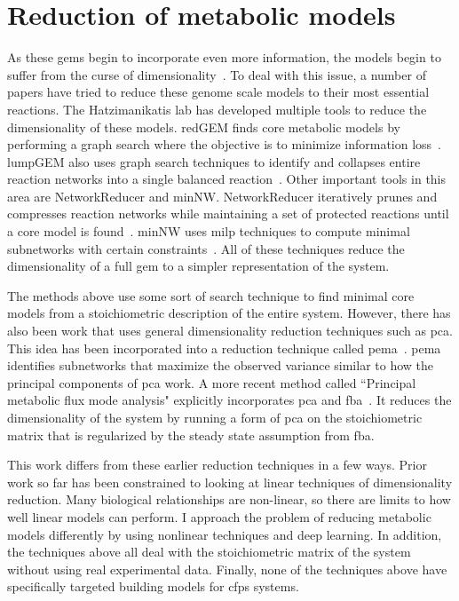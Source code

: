 \section{Reduction of metabolic models}
As these \glspl{gem} begin to incorporate even more information, the models begin to suffer from the curse of dimensionality~\cite{bellman2013dynamic}.
To deal with this issue, a number of papers have tried to reduce these genome scale models to their most essential reactions.
The Hatzimanikatis lab has developed multiple tools to reduce the dimensionality of these models.
redGEM finds core metabolic models by performing a graph search where the objective is to minimize information loss~\cite{ataman2017redgem}.
lumpGEM also uses graph search techniques to identify and collapses entire reaction networks into a single balanced reaction~\cite{ataman2017lumpgem}.
Other important tools in this area are NetworkReducer and minNW.
NetworkReducer iteratively prunes and compresses reaction networks while maintaining a set of protected reactions until a core model is found~\cite{erdrich2015algorithm}.
minNW uses \gls{milp} techniques to compute minimal subnetworks with certain constraints~\cite{rohl2017mixed}.
All of these techniques reduce the dimensionality of a full \gls{gem} to a simpler representation of the system.

The methods above use some sort of search technique to find minimal core models from a stoichiometric description of the entire system.
However, there has also been work that uses general dimensionality reduction techniques such as \gls{pca}.
This idea has been incorporated into a reduction technique called \gls{pema}~\cite{von2016principal}.
\gls{pema} identifies subnetworks that maximize the observed variance similar to how the principal components of \gls{pca} work.
A more recent method called ``Principal metabolic flux mode analysis" explicitly incorporates \gls{pca} and \gls{fba}~\cite{bhadra2017principal}.
It reduces the dimensionality of the system by running a form of \gls{pca} on the stoichiometric matrix that is regularized by the steady state assumption from \gls{fba}.

This work differs from these earlier reduction techniques in a few ways.
Prior work so far has been constrained to looking at linear techniques of dimensionality reduction.
Many biological relationships are non-linear, so there are limits to how well linear models can perform.
I approach the problem of reducing metabolic models differently by using nonlinear techniques and deep learning.
In addition, the techniques above all deal with the stoichiometric matrix of the system without using real experimental data.
Finally, none of the techniques above have specifically targeted building models for \gls{cfps} systems.


